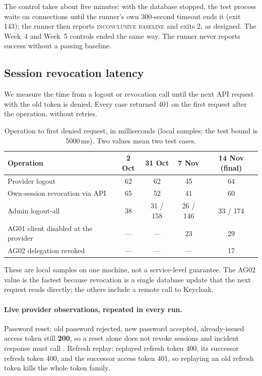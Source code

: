 The control takes about five minutes: with the database stopped, the test process waits on connections until the runner's own 300-second timeout ends it (exit 143); the runner then reports \textsc{inconclusive baseline} and exits 2, as designed. The Week~4 and Week~5 controls ended the same way. The runner never reports success without a passing baseline.

\subsection{Session revocation latency}
We measure the time from a logout or revocation call until the next API request with the old token is denied. Every case returned 401 on the first request after the operation, without retries.

\begin{table}[H]
\centering
\small
\begin{tabular}{@{}lcccc@{}}
\toprule
\textbf{Operation} & \textbf{2 Oct} & \textbf{31 Oct} & \textbf{7 Nov} & \textbf{14 Nov (final)}\\
\midrule
Provider logout & 62 & 62 & 45 & 64\\
Own-session revocation via API & 65 & 52 & 41 & 60\\
Admin logout-all & 38 & 31 / 158 & 26 / 146 & 33 / 174\\
AG01 client disabled at the provider & --- & --- & 23 & 29\\
AG02 delegation revoked & --- & --- & --- & 17\\
\bottomrule
\end{tabular}
\caption{Operation to first denied request, in milliseconds (local samples; the test bound is 5000\,ms). Two values mean two test cases.}
\end{table}
These are local samples on one machine, not a service-level guarantee. The AG02 value is the fastest because revocation is a single database update that the next request reads directly; the others include a remote call to Keycloak.

\paragraph{Live provider observations, repeated in every run.} Password reset: old password rejected, new password accepted, already-issued access token still \textbf{200}, so a reset alone does not revoke sessions and incident response must call . Refresh replay: replayed refresh token 400, its successor refresh token 400, and the successor access token 401, so replaying an old refresh token kills the whole token family.

